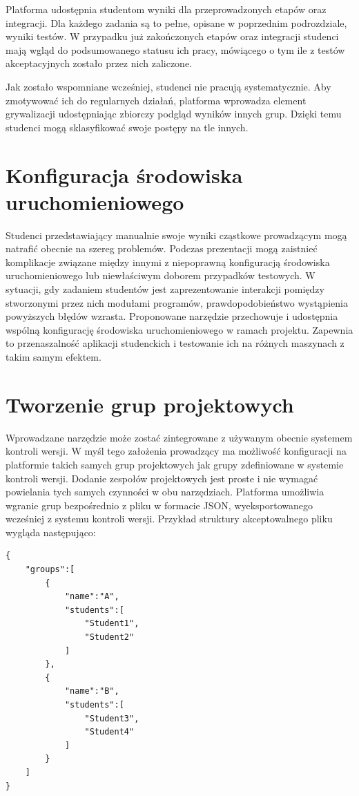 Platforma udostępnia studentom wyniki dla przeprowadzonych etapów oraz integracji.
Dla każdego zadania są to pełne, opisane w poprzednim podrozdziale, wyniki testów.
W przypadku już zakończonych etapów oraz integracji studenci mają wgląd do podsumowanego statusu ich pracy, mówiącego o tym ile z testów akceptacyjnych zostało przez nich zaliczone.

Jak zostało wspomniane wcześniej, studenci nie pracują systematycznie.
Aby zmotywować ich do regularnych działań, platforma wprowadza element grywalizacji udostępniając zbiorczy podgląd wyników innych grup.
Dzięki temu studenci mogą sklasyfikować swoje postępy na tle innych.


\section{Konfiguracja środowiska uruchomieniowego}

Studenci przedstawiający manualnie swoje wyniki cząstkowe prowadzącym mogą natrafić obecnie na szereg problemów.
Podczas prezentacji mogą zaistnieć komplikacje związane między innymi z niepoprawną konfiguracją środowiska uruchomieniowego lub niewłaściwym doborem przypadków testowych.
W sytuacji, gdy zadaniem studentów jest zaprezentowanie interakcji pomiędzy stworzonymi przez nich modułami programów, prawdopodobieństwo wystąpienia powyższych błędów wzrasta.
Proponowane narzędzie przechowuje i udostępnia wspólną konfigurację środowiska uruchomieniowego w ramach projektu.
Zapewnia to przenaszalność aplikacji studenckich i testowanie ich na różnych maszynach z takim samym efektem.


\section{Tworzenie grup projektowych}
\label{adding_project_groups}

Wprowadzane narzędzie może zostać zintegrowane z używanym obecnie systemem kontroli wersji.
W myśl tego założenia prowadzący ma możliwość konfiguracji na platformie takich samych grup projektowych jak grupy zdefiniowane w systemie kontroli wersji.
Dodanie zespołów projektowych jest proste i nie wymagać powielania tych samych czynności w obu narzędziach.
Platforma umożliwia wgranie grup bezpośrednio z pliku w formacie JSON, wyeksportowanego wcześniej z systemu kontroli wersji.
Przykład struktury akceptowalnego pliku wygląda następująco:

{\selectfont
\footnotesize
\begin{lstlisting}
{
    "groups":[
        {
            "name":"A",
            "students":[
                "Student1",
                "Student2"
            ]
        },
        {
            "name":"B",
            "students":[
                "Student3",
                "Student4"
            ]
        }
    ]
}
\end{lstlisting}
}


